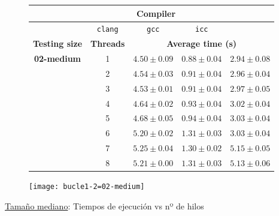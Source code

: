 \begin{figure}[H]
    \centering
    \begin{subfigure}{0.4\textwidth}
        \begin{adjustbox}{width=\textwidth} 
        \begin{tabular}{|c|c|c|c|c|}
            \hline
            \rowcolor{azul} \multicolumn{2}{|c|}{}&\multicolumn{3}{c|}{\textbf{Compiler}} \\ \hline
            \rowcolor{azul} \multicolumn{2}{|c|}{}&\texttt{clang}&\texttt{gcc}&\texttt{icc}\\ \hline
            \rowcolor{azul} \textbf{Testing size} & \textbf{Threads}&\multicolumn{3}{c|}{\textbf{Average time (s)}} \\ \hline
            \multirow{8}{2.5cm}{\textbf{02-medium}} & 1 & \(4.50\pm{0.09}\) & \(0.88\pm{0.04}\) & \(2.94\pm{0.08}\) \\ \cline{2-5}
            & 2 & \(4.54\pm{0.03}\) & \(0.91\pm{0.04}\) & \(2.96\pm{0.04}\) \\ \cline{2-5}
            & 3 & \(4.53\pm{0.01}\) & \(0.91\pm{0.04}\) & \(2.97\pm{0.05}\) \\ \cline{2-5}
            & 4 & \(4.64\pm{0.02}\) & \(0.93\pm{0.04}\) & \(3.02\pm{0.04}\) \\ \cline{2-5}
            & 5 & \(4.68\pm{0.05}\) & \(0.94\pm{0.04}\) & \(3.03\pm{0.04}\) \\ \cline{2-5}
            & 6 & \(5.20\pm{0.02}\) & \(1.31\pm{0.03}\) & \(3.03\pm{0.04}\) \\ \cline{2-5}
            & 7 & \(5.25\pm{0.04}\) & \(1.30\pm{0.02}\) & \(5.15\pm{0.05}\) \\ \cline{2-5}
            & 8 & \(5.21\pm{0.00}\) & \(1.31\pm{0.03}\) & \(5.13\pm{0.06}\) \\ \hline
        \end{tabular}
        \end{adjustbox}
    \end{subfigure}
    \hfill
    \begin{subfigure}{0.5\textwidth}
        \texttt{[image: bucle1-2=02-medium]}
    \end{subfigure}
    \caption{\underline{Tamaño mediano}: Tiempos de ejecución vs nº de hilos}
    \label{bucle1-2=02-medium}
\end{figure}

